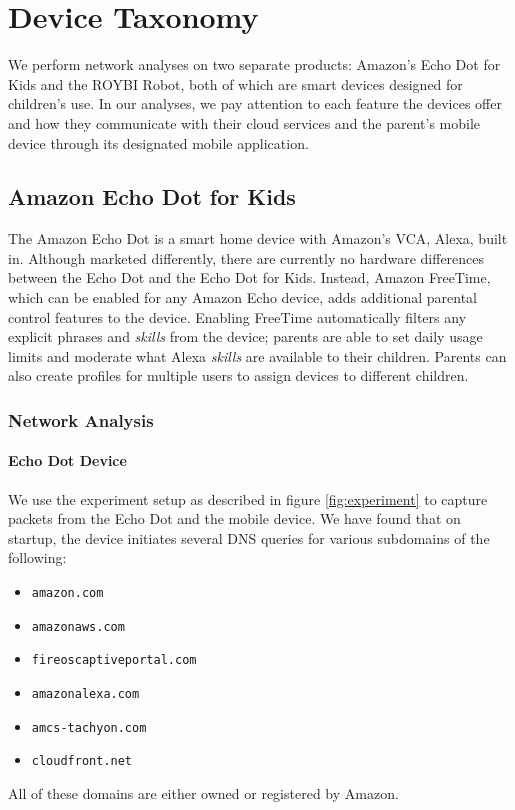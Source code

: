 \documentclass[12pt]{ucthesis}
\begin{document}
\chapter{Device Taxonomy}
\label{ch:taxonomy}
We perform network analyses on two separate products: Amazon's Echo Dot for Kids and the ROYBI Robot, both of which are smart devices designed for children's use. In our analyses, we pay attention to each feature the devices offer and how they communicate with their cloud services and the parent's mobile device through its designated mobile application.

\section{Amazon Echo Dot for Kids}
The Amazon Echo Dot is a smart home device with Amazon's VCA, Alexa, built in. Although marketed differently, there are currently no hardware differences between the Echo Dot and the Echo Dot for Kids. Instead, Amazon FreeTime, which can be enabled for any Amazon Echo device, adds additional parental control features to the device. Enabling FreeTime automatically filters any explicit phrases and \textit{skills} from the device; parents are able to set daily usage limits and moderate what Alexa \textit{skills} are available to their children. Parents can also create profiles for multiple users to assign devices to different children.

\subsection{Network Analysis}
\subsubsection{Echo Dot Device}
We use the experiment setup as described in figure \ref{fig:experiment} to capture packets from the Echo Dot and the mobile device. We have found that on startup, the device initiates several DNS queries for various subdomains of the following:
\begin{itemize} 
    \item \texttt{amazon.com}
    \item \texttt{amazonaws.com}
    \item \texttt{fireoscaptiveportal.com}
    \item \texttt{amazonalexa.com}
    \item \texttt{amcs-tachyon.com}
    \item \texttt{cloudfront.net}
\end{itemize}
All of these domains are either owned or registered by Amazon. 
\end{document}
